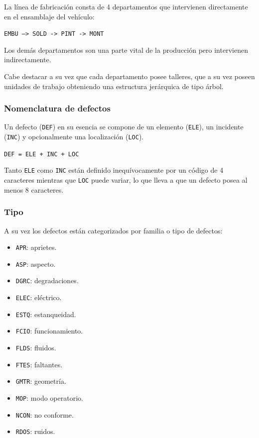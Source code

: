 \documentclass[a4paper,12pt]{article}
\begin{document}
La línea de fabricación consta de 4 departamentos que intervienen directamente en el ensamblaje del vehículo:

\texttt{EMBU --> SOLD -> PINT -> MONT}

Los demás departamentos son una parte vital de la producción pero intervienen indirectamente.

Cabe destacar a su vez que cada departamento posee talleres, que a su vez poseen unidades de trabajo obteniendo una estructura jerárquica de tipo árbol.

\subsubsection{Nomenclatura de defectos}

Un defecto (\texttt{DEF}) en su esencia se compone de un elemento (\texttt{ELE}), un incidente (\texttt{INC}) y opcionalmente una localización (\texttt{LOC}).

\texttt{DEF = ELE + INC + LOC}

Tanto \texttt{ELE} como \texttt{INC} están definido inequívocamente por un código de 4 caracteres mientras que \texttt{LOC} puede variar, lo que lleva a que un defecto posea al menos 8 caracteres.

\subsubsection{Tipo}
A su vez los defectos están categorizados por familia o tipo de defectos:

\begin{itemize}
	\item \texttt{APR}: aprietes.
	\item \texttt{ASP}: aspecto.
	\item \texttt{DGRC}: degradaciones.
	\item \texttt{ELEC}: eléctrico.
	\item \texttt{ESTQ}: estanqueidad.
	\item \texttt{FCIO}: funcionamiento.
	\item \texttt{FLDS}: fluidos.
	\item \texttt{FTES}: faltantes.
	\item \texttt{GMTR}: geometría.
	\item \texttt{MOP}: modo operatorio.
	\item \texttt{NCON}: no conforme.
	\item \texttt{RDOS}: ruidos.
\end{itemize}
\end{document}
